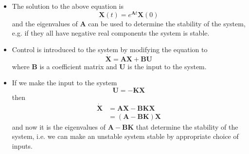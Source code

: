 \documentclass{article}
\renewcommand{\vec}[1]{\boldsymbol{\mathbf{#1}}}
\newcommand{\dvec}[1]{\dot{\vec{#1}}}
\begin{document}
\begin{itemize}
  \item The solution to the above equation is \[\vec{X}(t) = e^{\vec{A} t} \vec{X}(0)\] and the eigenvalues of $\vec{A}$ can be used to determine the stability of the system, e.g. if they all have negative real components the system is stable.

  \item Control is introduced to the system by modifying the equation to \[\dvec{X} = \vec{A} \vec{X} + \vec{B} \vec{U}\] where $\vec{B}$ is a coefficient matrix and $\vec{U}$ is the input to the system.

  \item If we make the input to the system \[\vec{U} = -\vec{K} \vec{X}\] then \begin{align*}
          \dvec{X} & = \vec{A} \vec{X} - \vec{B} \vec{K} \vec{X} \\
                   & = (\vec{A} - \vec{B} \vec{K}) \vec{X}
        \end{align*} and now it is the eigenvalues of $\vec{A} - \vec{B} \vec{K}$ that determine the stability of the system, i.e. we can make an unstable system stable by appropriate choice of inputs.
\end{itemize}
\end{document}

